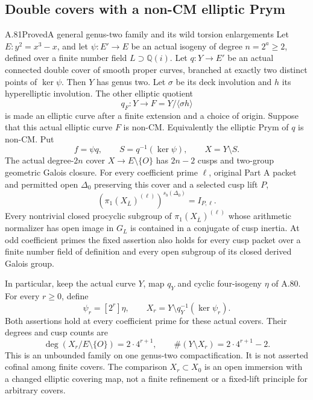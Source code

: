 \subsection{Double covers with a non-CM elliptic Prym}

\begin{statement}{A.81}{Proved}{A general genus-two family and its wild torsion enlargements}
Let \(E:y^2=x^3-x\), and let
\(\psi:E'\to E\) be an actual isogeny of degree
\(n=2^a\ge2\), defined over a finite number field \(L\supset\mathbb Q(i)\).
Let \(q:Y\to E'\) be an actual connected double cover
of smooth proper curves, branched at exactly two distinct
points of \(\ker\psi\). Then \(Y\) has genus two.
Let \(\sigma\) be its deck involution and \(h\) its
hyperelliptic involution. The other elliptic quotient
\[
                  q_F:Y\longrightarrow F=Y/\langle\sigma h\rangle
                                                        \tag{A.81.1}
\]
is made an elliptic curve after a finite extension and a
choice of origin. Suppose that this actual elliptic curve
\(F\) is non-CM. Equivalently the elliptic Prym of \(q\)
is non-CM. Put
\[
       f=\psi q,\qquad S=q^{-1}(\ker\psi),\qquad X=Y\setminus S.
                                                        \tag{A.81.2}
\]
The actual degree-\(2n\) cover \(X\to E\setminus\{O\}\)
has \(2n-2\) cusps and two-group geometric Galois closure.
For every coefficient prime \(\ell\), original Part A packet
and permitted open \(\Delta_0\) preserving this cover and a
selected cusp lift \(P\),
\[
 \left(\pi_1(X_{\overline L})^{(\ell)}\right)^{s_b(\Delta_0)}
                              =I_{P,\ell}.             \tag{A.81.2a}
\]
Every nontrivial closed procyclic subgroup of
\(\pi_1(X_{\overline L})^{(\ell)}\) whose arithmetic
normalizer has open image in \(G_L\) is contained in a
conjugate of cusp inertia.
At odd coefficient primes the fixed assertion also holds
for every cusp packet over a finite number field of definition
and every open subgroup of its closed derived Galois group.

In particular, keep the actual curve \(Y\), map \(q_Y\)
and cyclic four-isogeny \(\eta\) of A.80. For every
\(r\ge0\), define
\[
 \psi_r=[2^r]\eta,\qquad
 X_r=Y\setminus q_Y^{-1}(\ker\psi_r).
                                                        \tag{A.81.3}
\]
Both assertions hold at every coefficient prime for these
actual covers. Their degrees and cusp counts are
\[
              \deg(X_r/E\setminus\{O\})=2\cdot4^{r+1},
              \qquad \#(Y\setminus X_r)=2\cdot4^{r+1}-2.
                                                        \tag{A.81.4}
\]
This is an unbounded family on one genus-two compactification.
It is not asserted cofinal among finite covers. The comparison
\(X_r\subset X_0\) is an open immersion with a changed
elliptic covering map, not a finite refinement or a fixed-lift
principle for arbitrary covers.
\end{statement}


